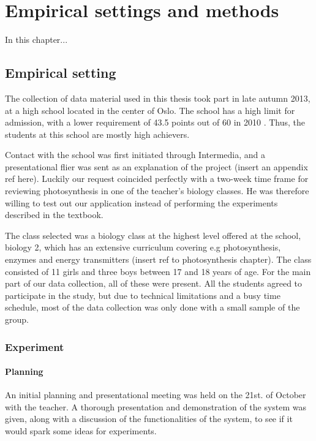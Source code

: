 \chapter{Empirical settings and methods}
In this chapter...

\section{Empirical setting}
The collection of data material used in this thesis took part in late autumn 2013, at a high school located in the center of Oslo. The school has a high limit for admission, with a lower requirement of 43.5 points out of 60 in 2010 \citep{utdanningsetaten}. Thus, the students at this school are mostly high achievers. 

Contact with the school was first initiated through Intermedia, and a presentational flier was sent as an explanation of the project (insert an appendix ref here). Luckily our request coincided perfectly with a two-week time frame for reviewing photosynthesis in one of the teacher's biology classes. He was therefore willing to test out our application instead of performing the experiments described in the textbook. 

The class selected was a biology class at the highest level offered at the school, biology 2, which has an extensive curriculum covering e.g photosynthesis, enzymes and energy transmitters (insert ref to photosynthesis chapter). The class consisted of 11 girls and three boys between 17 and 18 years of age. For the main part of our data collection, all of these were present. All the students agreed to participate in the study, but due to technical limitations and a busy time schedule, most of the data collection was only done with a small sample of the group. 

\subsection{Experiment}
\subsubsection{Planning}
An initial planning and presentational meeting was held on the 21st. of October with the teacher. A thorough presentation and demonstration of the system was given, along with a discussion of the functionalities of the system, to see if it would spark some ideas for experiments. 

